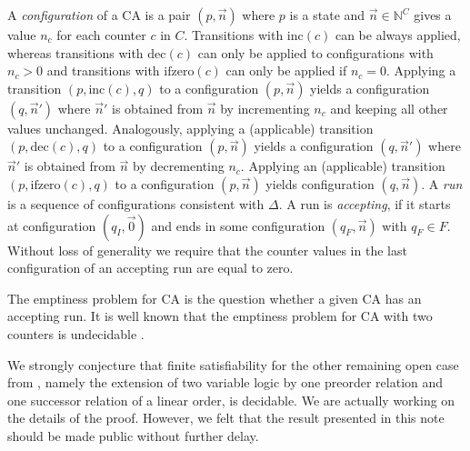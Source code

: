 \documentclass[11pt, a4paper]{article}
\renewcommand{\(}{\left (}
\renewcommand{\)}{\right )}
\newcommand{\myemph}[1]{\emph{#1}}
\theoremstyle{plain}
\newcommand  {\N}   {\ensuremath{\mathbb{N}}}
\newcommand{\inc}{\ensuremath{\text{inc}}}
\newcommand{\dec}{\ensuremath{\text{dec}}}
\newcommand{\ifzero}{\ensuremath{\text{ifzero}}}
\newcommand{\ifz}{\ifzero}
\begin{document}
A \myemph{configuration} of a CA is a pair $(p, \vec n)$ where $p$ is a state and $\vec n \in \N^C$ gives a value $n_c$ for each counter $c$ in $C$. 
Transitions with $\inc(c)$ can be always applied, whereas transitions with $\dec(c)$ can only be applied to configurations with $n_c > 0$ and 
transitions with $\ifz(c)$ can only be applied if $n_c = 0$. Applying a transition $(p, \inc(c), q)$ to a configuration $(p, \vec n)$ yields 
a configuration $(q, \vec n')$ where $\vec n'$ is obtained from $\vec n$ by incrementing $n_c$ and keeping all other values unchanged. Analogously, applying a (applicable) transition $(p, \dec(c), q)$ to a configuration $(p, \vec n)$ yields a configuration $(q, \vec n')$ where $\vec n'$ is obtained from $\vec n$ by decrementing $n_c$. Applying an (applicable) transition $(p, \ifz(c), q)$ to a configuration $(p, \vec n)$ yields configuration $(q, \vec n)$. A \myemph{run} is a sequence of configurations consistent with $\Delta$. A run is \myemph{accepting}, if it starts at configuration $(q_I, \vec 0)$ and ends in some configuration $(q_F, \vec n)$ with $q_F \in F$. Without loss of generality we require that the counter values in the last configuration of an accepting run are equal to zero.

The emptiness problem for CA is the question whether a given CA has an accepting run. It is well known that the emptiness problem for CA with two counters is undecidable \cite{Minsky1967}.

\proofoflsps
 

We strongly conjecture that finite satisfiability for the other remaining open case from \cite{ManuelZ13}, namely the extension of two variable logic by one preorder relation and one successor relation of a linear order, is decidable. We are actually working on the details of the proof. However, we felt that the result presented in this note should be made public without further delay. 
  



\end{document}
